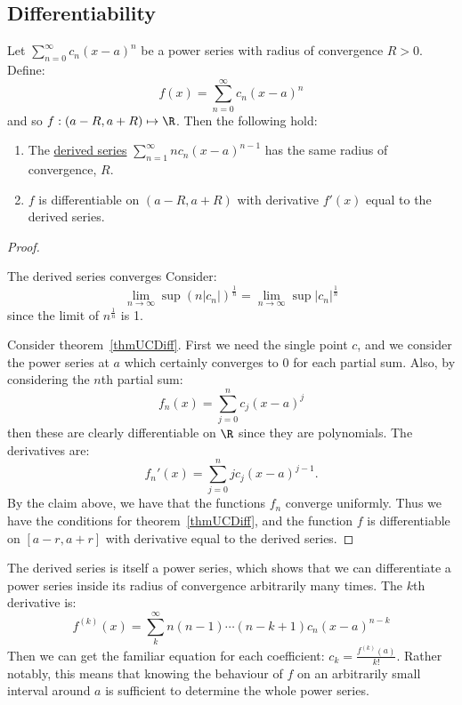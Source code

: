 \documentclass[../Main.tex]{subfiles}
\begin{document}
\subsection{Differentiability}
\begin{theorem}
    Let $\sum_{n = 0}^\infty c_n (x-a)^n$ be a power series with radius of convergence $R > 0$. Define:
    \begin{equation*}
        f(x) = \sum_{n = 0}^\infty c_n (x-a)^n
    \end{equation*}
    and so $f : (a-R, a+R) \mapsto \R$. Then the following hold:
    \begin{enumerate}
        \item The \underline{derived series} $\sum_{n = 1}^\infty nc_n (x-a)^{n-1}$ has the same radius of convergence, $R$.
        \item $f$ is differentiable on $(a-R, a+R)$ with derivative $f'(x)$ equal to the derived series.
    \end{enumerate}
    \label{thmPSDiff}
\end{theorem}
\begin{proof}
    \begin{subproof}{The derived series converges}
        Consider:
        \begin{equation*}
            \lim_{n \to \infty} \sup (n|c_n|)^\frac{1}{n} = \lim_{n \to \infty} \sup |c_n|^\frac{1}{n}
        \end{equation*}
        since the limit of $n^\frac{1}{n}$ is 1.
    \end{subproof}
    Consider theorem~\ref{thmUCDiff}. First we need the single point $c$, and we consider the power series at $a$ which certainly converges to $0$ for each partial sum. Also, by considering the $n$th partial sum:
    \begin{equation*}
        f_n(x) = \sum_{j = 0}^n c_j (x-a)^j
    \end{equation*}
    then these are clearly differentiable on $\R$ since they are polynomials. The derivatives are:
    \begin{equation*}
        f_n'(x) = \sum_{j = 0}^n jc_j (x-a)^{j-1}.
    \end{equation*}
    By the claim above, we have that the functions $f_n$ converge uniformly. Thus we have the conditions for theorem~\ref{thmUCDiff}, and the function $f$ is differentiable on $[a-r, a+r]$ with derivative equal to the derived series.
\end{proof}
\begin{remark}
    The derived series is itself a power series, which shows that we can differentiate a power series inside its radius of convergence arbitrarily many times. The $k$th derivative is:
    \begin{equation*}
        f^{(k)}(x) = \sum_k^\infty n(n-1)\cdots(n-k+1) c_n(x-a)^{n-k}
    \end{equation*}
    Then we can get the familiar equation for each coefficient: $c_k = \frac{f^{(k)}(a)}{k!}$. Rather notably, this means that knowing the behaviour of $f$ on an arbitrarily small interval around $a$ is sufficient to determine the whole power series.
\end{remark}
\end{document}
